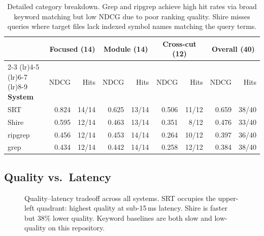 \documentclass[11pt,a4paper]{article}
\begin{document}
\begin{table}[h]
\centering
\footnotesize
\begin{tabular}{lrrrrrrrr}
\toprule
& \multicolumn{2}{c}{\textbf{Focused (14)}} & \multicolumn{2}{c}{\textbf{Module (14)}} & \multicolumn{2}{c}{\textbf{Cross-cut (12)}} & \multicolumn{2}{c}{\textbf{Overall (40)}} \\
\cmidrule(lr){2-3} \cmidrule(lr){4-5} \cmidrule(lr){6-7} \cmidrule(lr){8-9}
\textbf{System} & NDCG & Hits & NDCG & Hits & NDCG & Hits & NDCG & Hits \\
\midrule
SRT     & 0.824 & 14/14 & 0.625 & 13/14 & 0.506 & 11/12 & 0.659 & 38/40 \\
Shire   & 0.595 & 12/14 & 0.463 & 13/14 & 0.351 &  8/12 & 0.476 & 33/40 \\
ripgrep & 0.456 & 12/14 & 0.453 & 14/14 & 0.264 & 10/12 & 0.397 & 36/40 \\
grep    & 0.434 & 12/14 & 0.442 & 14/14 & 0.258 & 12/12 & 0.384 & 38/40 \\
\bottomrule
\end{tabular}
\caption{Detailed category breakdown. Grep and ripgrep achieve high hit rates via broad keyword matching but low NDCG due to poor ranking quality. Shire misses queries where target files lack indexed symbol names matching the query terms.}
\end{table}

\subsection{Quality vs.\ Latency}

\begin{figure}[h]
\centering
{}
\caption{Quality--latency tradeoff across all systems. SRT occupies the upper-left quadrant: highest quality at sub-15\,ms latency. Shire is faster but 38\% lower quality. Keyword baselines are both slow and low-quality on this repository.}
\end{figure}
\end{document}
